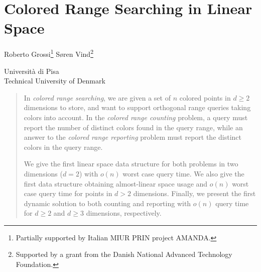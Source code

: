 \chapter{Colored Range Searching in Linear Space}\label{chp:coloredrangesearching}

\begin{infosection}
    \begin{authors}
        Roberto Grossi\footnote{Partially supported by Italian MIUR PRIN project AMANDA.} \qquad S{\o}ren Vind\footnote{Supported by a grant from the Danish National Advanced Technology Foundation.}
    \end{authors}

    \begin{uninames}
         Universit\`{a} di Pisa \\
         Technical University of Denmark
    \end{uninames}

    \begin{abstract}
    In \emph{colored range searching}, we are given a set of $n$ colored points in $d \geq 2$ dimensions to store, and want to support orthogonal range queries taking colors into account. In the \emph{colored range counting} problem, a query must report the number of distinct colors found in the query range, while an answer to the \emph{colored range reporting} problem must report the distinct colors in the query range.
    
    We give the first linear space data structure for both problems in two dimensions ($d=2$) with $o(n)$ worst case query time. We also give the first data structure obtaining almost-linear space usage and $o(n)$ worst case query time for points in $d > 2$ dimensions. Finally, we present the first dynamic solution to both counting and reporting with $o(n)$ query time for $d \geq 2$ and $d \geq 3$ dimensions, respectively.
    \end{abstract}
\end{infosection}


